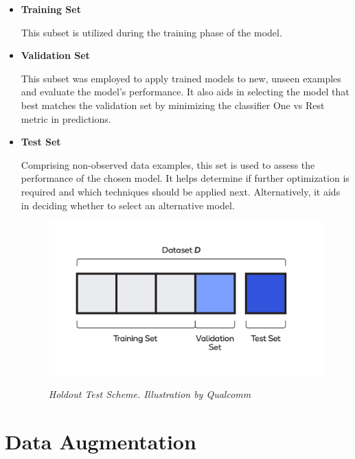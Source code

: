 \begin{itemize}

  \item \textbf{Training Set}

This subset is utilized during the training phase of the model.

\item \textbf{Validation Set}

This subset was employed to apply trained models to new, unseen examples and evaluate the model's performance. It also aids in selecting the model that best matches the validation set by minimizing the classifier One vs Rest metric in predictions.

\item \textbf{Test Set}

Comprising non-observed data examples, this set is used to assess the performance of the chosen model. It helps determine if further optimization is required and which techniques should be applied next. Alternatively, it aids in deciding whether to select an alternative model.


\begin{figure}[H]
\centering
\begin{adjustbox}{width=0.8\textwidth, trim={0cm 0.5cm 0cm 0.5cm}, clip}
\includegraphics[width=\textwidth]{imatges/preliminaries/train-test-validation-sets.png}
\end{adjustbox}
\caption[Holdout Test Scheme]{\textit{Holdout Test Scheme. Illustration by Qualcomm}}
{\label{fig:holdout-test-scheme}}
\end{figure}

\end{itemize}

\newpage

\section{Data Augmentation}

